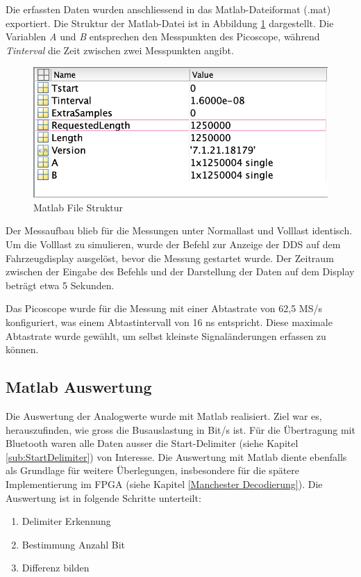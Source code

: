 Die erfassten Daten wurden anschliessend in das Matlab-Dateiformat (.mat) exportiert. Die Struktur der Matlab-Datei ist in Abbildung \ref{fig:MatlabFileStruktur} dargestellt. Die Variablen \textit{A} und \textit{B} entsprechen den Messpunkten des Picoscope, während \textit{Tinterval} die Zeit zwischen zwei Messpunkten angibt. 

\begin{figure}[H]
    \centering
    \includegraphics[width=0.5\linewidth]{Figures/Chap3/Busauslastung/Matlab_file_struktur.png}
    \caption{Matlab File Struktur}
    \label{fig:MatlabFileStruktur}
\end{figure}

Der Messaufbau blieb für die Messungen unter Normallast und Volllast identisch. Um die Volllast zu simulieren, wurde der Befehl zur Anzeige der DDS auf dem Fahrzeugdisplay ausgelöst, bevor die Messung gestartet wurde. Der Zeitraum zwischen der Eingabe des Befehls und der Darstellung der Daten auf dem Display beträgt etwa 5 Sekunden.

Das Picoscope wurde für die Messung mit einer Abtastrate von 62,5 MS/s konfiguriert, was einem Abtastintervall von 16 ns entspricht. Diese maximale Abtastrate wurde gewählt, um selbst kleinste Signaländerungen erfassen zu können. 

\subsection{Matlab Auswertung}
Die Auswertung der Analogwerte wurde mit Matlab realisiert. Ziel war es, herauszufinden, wie gross die Busauslastung in Bit/s ist. Für die Übertragung mit Bluetooth waren alle Daten ausser die Start-Delimiter (siehe Kapitel \ref{sub:StartDelimiter}) von Interesse. Die Auswertung mit Matlab diente ebenfalls als Grundlage für weitere Überlegungen, insbesondere für die spätere Implementierung im FPGA (siehe Kapitel \ref{Manchester Decodierung}). Die Auswertung ist in folgende Schritte unterteilt:
\begin{enumerate}
    \item Delimiter Erkennung
    \item Bestimmung Anzahl Bit
    \item Differenz bilden
\end{enumerate}


